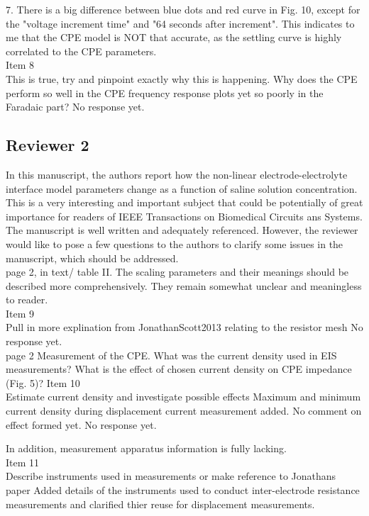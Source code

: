\documentclass[journal, a4paper]{IEEEtran}
\begin{document}
{{7. There is a big difference between blue dots and red curve in Fig. 10, except for the "voltage increment time" and "64 seconds after increment".  This indicates to me that the CPE model is NOT that accurate, as the settling curve is highly correlated to the CPE parameters.\\
{\color{OliveGreen}
    Item 8\\
    {\color{Red} This is true, try and pinpoint exactly why this is happening. Why does the CPE perform so well in the CPE frequency response plots yet so poorly in the Faradaic part?}
    No response yet.
}\\
}

\subsection*{Reviewer 2}

{\color{blue}
In this manuscript, the authors report how the non-linear electrode-electrolyte interface model parameters change as a function of saline solution concentration. This is a very interesting and important subject that could be potentially of great importance for readers of IEEE Transactions on Biomedical Circuits ans Systems. The manuscript is well written and adequately referenced. However, the reviewer would like to pose a few questions to the authors to clarify some  issues in the manuscript, which should be addressed.\\

page 2, in text/ table II. The scaling parameters and their meanings should be described more comprehensively. They remain somewhat unclear and meaningless to reader.\\
{\color{OliveGreen}
    Item 9\\
    {\color{Red} Pull in more explination from JonathanScott2013 relating to the resistor mesh}
    No response yet.
}\\

page 2 Measurement of the CPE. What was the current density used in EIS measurements?
What is the effect of chosen current density on CPE impedance (Fig. 5)?
{\color{OliveGreen}
    Item 10\\
    {\color{Red} Estimate current density and investigate possible effects}
    Maximum and minimum current density during displacement current measurement added. No comment on effect formed yet. No response yet.
}

In addition,  measurement apparatus information is fully lacking.\\
{\color{OliveGreen}
    Item 11\\
    {\color{Red} Describe instruments used in measurements or make reference to Jonathans paper}
    Added details of the instruments used to conduct inter-electrode resistance measurements and clarified thier reuse for displacement measurements.
}\\

}}
\end{document}
